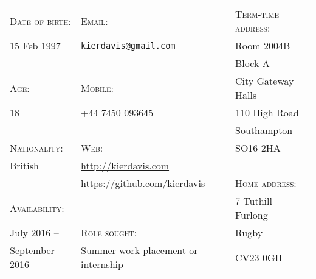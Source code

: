 \vspace{-1em}
\hrulefill
\vspace{1em}

{
\newcommand{\h}[1]{\textsc{#1}:}
\newcommand{\n}[1]{\hspace{.8em} #1}
\begin{tabu} to \textwidth {X[1.3,l] X[2.5,l] X[1.5,l]}
    \h{Date of birth}  & \h{Email}                                 & \h{Term-time address}  \\
    \n{15 Feb 1997}    & \n{\texttt{kierdavis@gmail.com}}          & \n{Room 2004B}         \\
                       &                                           & \n{Block A}            \\
    \h{Age}            & \h{Mobile}                                & \n{City Gateway Halls} \\
    \n{18}             & \n{+44 7450 093645}                       & \n{110 High Road}      \\
                       &                                           & \n{Southampton}        \\
    \h{Nationality}    & \h{Web}                                   & \n{SO16 2HA}           \\
    \n{British}        & \n{\url{http://kierdavis.com}}            &                        \\
                       & \n{\url{https://github.com/kierdavis}}    & \h{Home address}       \\
    \h{Availability}   &                                           & \n{7 Tuthill Furlong}  \\
    \n{July 2016 --}   & \h{Role sought}                           & \n{Rugby}              \\
    \n{September 2016} & \n{Summer work placement or internship}   & \n{CV23 0GH}           \\
\end{tabu}
}

\vspace{1em}
\hrulefill
